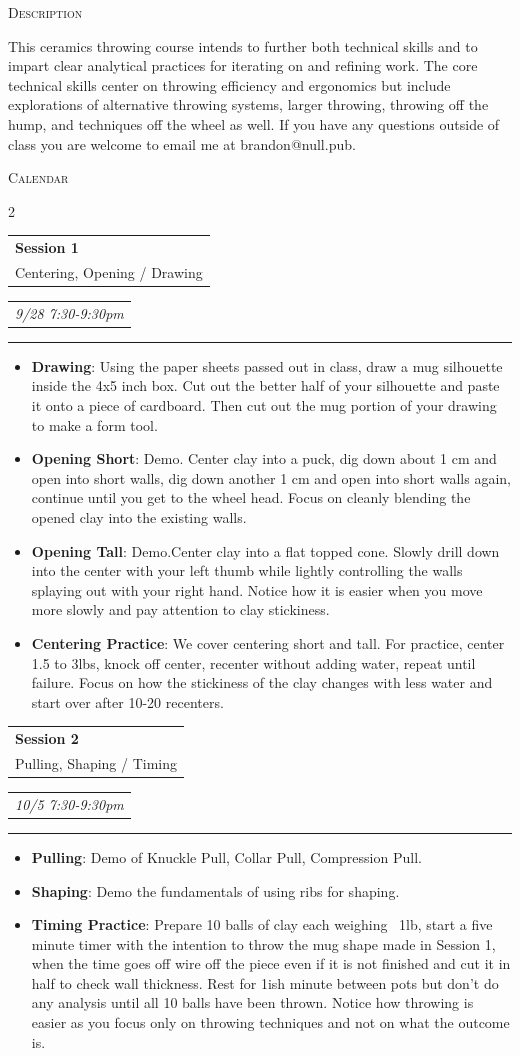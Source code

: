 \documentclass[9pt]{extarticle}
\makeatletter
\newcommand{\sub}[1]{
    {\raggedleft
        \large{\textsc{\color{OliveGreen}#1}}\par
    }
}
\newcommand{\split}[3]{
\noindent\begin{tabular}[t]{@{}l}
    \textbf{#1} \\ #2
\end{tabular}
\hfill
\begin{tabular}[t]{l@{}}
    \\
    \textit{#3}
\end{tabular}
\noindent\rule{\columnwidth}{0.5pt}
}
\makeatother
\begin{document}
\sub{Description}

This ceramics throwing course intends to further both technical skills
and to impart clear analytical practices for iterating on and refining
work.  The core technical skills center on throwing efficiency and
ergonomics but include explorations of alternative throwing systems, larger
throwing, throwing off the hump, and techniques off the wheel as well. If you
have any questions outside of class you are welcome to email me at
brandon@null.pub.


\sub{Calendar}

\begin{multicols}{2}

	\split{Session 1}{Centering, Opening / Drawing}{9/28 7:30-9:30pm}
	\begin{itemize}
		\item \textbf{Drawing}: Using the paper sheets passed out in class, draw a
		      mug silhouette inside the 4x5 inch box. Cut out the better half of your
		      silhouette and paste it onto a piece of cardboard. Then cut out the mug
		      portion of your drawing to make a form tool.
		\item \textbf{Opening Short}: Demo. Center clay into a puck, dig down about 1 cm
		      and open into short walls, dig down another 1 cm and open into short walls
		      again, continue until you get to the wheel head. Focus on cleanly
		      blending the opened clay into the existing walls.
		\item \textbf{Opening Tall}: Demo.Center clay into a flat topped cone. Slowly
		      drill down into the center with your left thumb while lightly controlling
		      the walls splaying out with your right hand. Notice how it is easier when
		      you move more slowly and pay attention to clay stickiness.
		\item \textbf{Centering Practice}: We cover centering short and tall. For practice,
		      center 1.5 to 3lbs, knock off center, recenter without adding water,
		      repeat until failure. Focus on how the stickiness of the clay changes with
		      less water and start over after 10-20 recenters.
	\end{itemize}

	\split{Session 2}{Pulling, Shaping / Timing}{10/5 7:30-9:30pm}
	\begin{itemize}
		\item \textbf{Pulling}: Demo of Knuckle Pull, Collar Pull, Compression Pull.
		\item \textbf{Shaping}: Demo the fundamentals of using ribs for shaping.
		\item \textbf{Timing Practice}: Prepare 10 balls of clay each weighing ~1lb, start a
		      five minute timer with the intention to throw the mug shape made in
		      Session 1, when the time goes off wire off the piece even if it is not
		      finished and cut it in half to check wall thickness. Rest for 1ish minute
		      between pots but don't do any analysis until all 10 balls have been
		      thrown. Notice how throwing is easier as you focus only on throwing
		      techniques and not on what the outcome is.
	\end{itemize}


\end{multicols}
\end{document}
